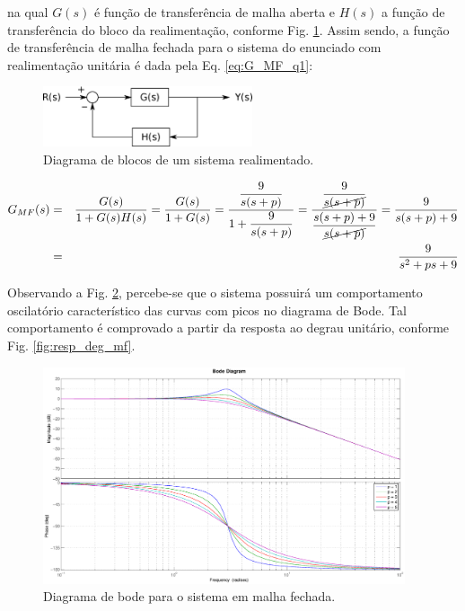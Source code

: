 \noindent na qual $G(s)$ é função de transferência de malha aberta e $H(s)$ a
função de transferência do bloco da realimentação, conforme Fig.
\ref{fig:diag_bloco}. Assim sendo, a função de transferência de malha fechada
para o sistema do enunciado com realimentação unitária é dada pela Eq.
\ref{eq:G_MF_q1}:

\begin{figure}[htb]
\centering
    \includegraphics[width=0.55\textwidth]{imgs/questao1/diag_bloco}
    \caption{Diagrama de blocos de um sistema realimentado.}
    \label{fig:diag_bloco}
\end{figure}

\begin{eqnarray}
G_{MF}(s) & = & \frac{G(s)}{1+G(s)H(s)} = \frac{G(s)}{1+G(s)} =
\frac{\displaystyle\frac{9}{s(s+p)}}{1+\displaystyle\frac{9}{s(s+p)}} =
\frac{\displaystyle\frac{9}{\cancel{s(s+p)}}}{\displaystyle\frac{s(s+p)+9}{\cancel{s(s+p)}}} =
\frac{9}{s(s+p)+9}\nonumber\\ 
          & = & \frac{9}{s^2 + ps + 9}\label{eq:G_MF_q1}
\end{eqnarray}

Observando a Fig. \ref{fig:bode_mf}, percebe-se que o sistema possuirá um
comportamento oscilatório característico das curvas com picos no diagrama de
Bode. Tal comportamento é comprovado a partir da resposta ao degrau unitário,
conforme Fig. \ref{fig:resp_deg_mf}.

\begin{figure}[htb]
\centering
    \includegraphics[width=0.95\textwidth]{imgs/questao1/bode_mf}
    \caption{Diagrama de bode para o sistema em malha fechada.}
    \label{fig:bode_mf}
\end{figure}


